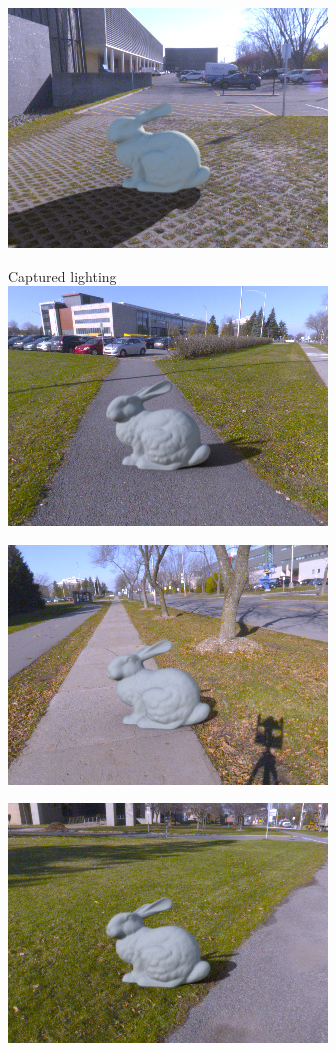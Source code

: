 \begin{minipage}{\linewidth}
\begin{multicols}{4}
\includegraphics[width=\mywidth]{AG8A2917_Panorama_hdr-corrected_009.jpg}

\vfill\null
\columnbreak

Captured lighting\\

\includegraphics[width=\mywidth]{AG8A2749_Panorama_hdr-corrected_002.jpg}

\includegraphics[width=\mywidth]{AG8A2791_Panorama_hdr-corrected.jpg}

\includegraphics[width=\mywidth]{AG8A2833_Panorama_hdr-corrected_003.jpg}


\end{multicols}
\end{minipage}
